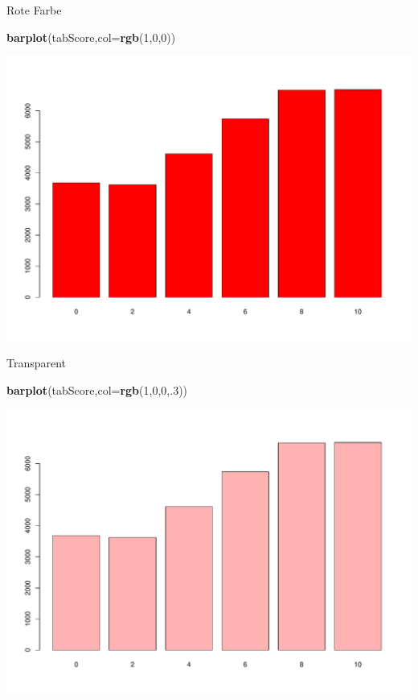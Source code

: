 \documentclass[ignorenonframetext,]{beamer}
\newenvironment{Shaded}{}{}
\newcommand{\KeywordTok}[1]{\textcolor[rgb]{0.00,0.44,0.13}{\textbf{{#1}}}}
\newcommand{\DataTypeTok}[1]{\textcolor[rgb]{0.56,0.13,0.00}{{#1}}}
\newcommand{\DecValTok}[1]{\textcolor[rgb]{0.25,0.63,0.44}{{#1}}}
\newcommand{\NormalTok}[1]{{#1}}
\begin{document}
\begin{frame}[fragile]{Rote Farbe}

\begin{Shaded}
\begin{Highlighting}[]
\KeywordTok{barplot}\NormalTok{(tabScore,}\DataTypeTok{col=}\KeywordTok{rgb}\NormalTok{(}\DecValTok{1}\NormalTok{,}\DecValTok{0}\NormalTok{,}\DecValTok{0}\NormalTok{))}
\end{Highlighting}
\end{Shaded}

\includegraphics{R_intern_files/figure-beamer/unnamed-chunk-207-1.pdf}

\end{frame}

\begin{frame}[fragile]{Transparent}

\begin{Shaded}
\begin{Highlighting}[]
\KeywordTok{barplot}\NormalTok{(tabScore,}\DataTypeTok{col=}\KeywordTok{rgb}\NormalTok{(}\DecValTok{1}\NormalTok{,}\DecValTok{0}\NormalTok{,}\DecValTok{0}\NormalTok{,.}\DecValTok{3}\NormalTok{))}
\end{Highlighting}
\end{Shaded}

\includegraphics{R_intern_files/figure-beamer/unnamed-chunk-208-1.pdf}

\end{frame}
\end{document}
